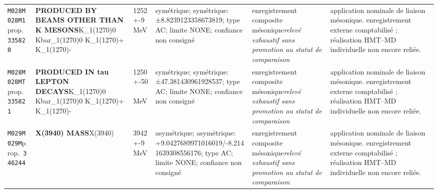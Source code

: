 \begin{landscape}
\begin{longtable}{L{1.85cm}L{4.45cm}L{2.35cm}L{4.05cm}L{3.35cm}L{7.15cm}}
\texttt{M028}\newline \texttt{M028M1}\newline prop.\ \texttt{335820} & \textbf{PRODUCED BY BEAMS OTHER THAN K MESONS}\newline K\_\allowbreak{}1(1270)0 \textbar{}\allowbreak{} Kbar\_\allowbreak{}1(1270)0 \textbar{}\allowbreak{} K\_\allowbreak{}1(1270)+ \textbar{}\allowbreak{} K\_\allowbreak{}1(1270)- & 1252+-9\,MeV & symétrique; symétrique: ±8.8239123358673819; type AC; limite NONE; confiance non consigné & enregistrement composite mésonique\newline \emph{relevé exhaustif sans promotion au statut de comparaison} & application nominale de liaison mésonique. enregistrement externe comptabilisé ; réalisation HMT--MD individuelle non encore reliée. \\
\texttt{M028}\newline \texttt{M028MT}\newline prop.\ \texttt{335821} & \textbf{PRODUCED IN tau LEPTON DECAYS}\newline K\_\allowbreak{}1(1270)0 \textbar{}\allowbreak{} Kbar\_\allowbreak{}1(1270)0 \textbar{}\allowbreak{} K\_\allowbreak{}1(1270)+ \textbar{}\allowbreak{} K\_\allowbreak{}1(1270)- & 1250+-50\,MeV & symétrique; symétrique: ±47.381430961928537; type AC; limite NONE; confiance non consigné & enregistrement composite mésonique\newline \emph{relevé exhaustif sans promotion au statut de comparaison} & application nominale de liaison mésonique. enregistrement externe comptabilisé ; réalisation HMT--MD individuelle non encore reliée. \\
\texttt{M029}\newline \texttt{M029M}\newline prop.\ \texttt{346244} & \textbf{X(3940) MASS}\newline X(3940) & 3942+-9\,MeV & asymétrique; asymétrique: +9.0427689971016019/-8.2141639308556176; type AC; limite NONE; confiance non consigné & enregistrement composite mésonique\newline \emph{relevé exhaustif sans promotion au statut de comparaison} & application nominale de liaison mésonique. enregistrement externe comptabilisé ; réalisation HMT--MD individuelle non encore reliée. \\

\end{longtable}
\end{landscape}
